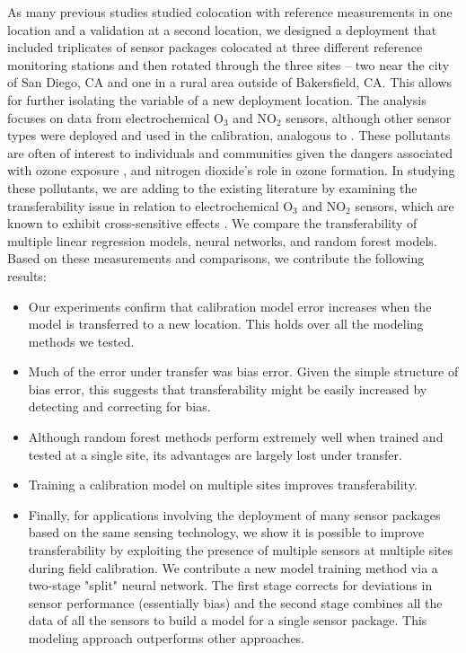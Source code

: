 \documentclass[journal abbreviation, manuscript]{copernicus}
\newcommand{\textus}[1]{$_{\text{#1}}$}
\begin{document}
As many previous studies studied colocation with reference measurements in one location and a validation at a second location, we designed a deployment that included triplicates of sensor packages colocated at three different reference monitoring stations and then rotated through the three sites – two  near the city of San Diego, CA and one in a rural area outside of Bakersfield, CA.   This allows for further isolating the variable of a new deployment location. The analysis focuses on data from electrochemical O\textus{3} and NO\textus{2} sensors, although other sensor types were deployed and used in the calibration, analogous to \citep{Bigi2018performance}.  These pollutants are often of interest to individuals and communities given the dangers associated with ozone exposure \citep{Brunekreef2002Air}, and nitrogen dioxide’s role in ozone formation. In studying these pollutants, we are adding to the existing literature by examining the transferability issue in relation to electrochemical O\textus{3} and NO\textus{2} sensors, which are known to exhibit cross-sensitive effects \citep{SPINELLE2015480}.  We compare the transferability of multiple linear regression models, neural networks, and random forest models.  Based on these measurements and comparisons, we contribute the following results:

\begin{itemize}
\item Our experiments confirm that calibration model error increases when the model is transferred to a new location.  This holds over all the modeling methods we tested.
\item Much of the error under transfer was bias error.  Given the simple structure of bias error, this suggests that transferability might be easily increased by detecting and correcting for bias.
\item Although random forest methods perform extremely well when trained and tested at a single site, its advantages are largely lost under transfer.
\item Training a calibration model on multiple sites improves transferability.
\item Finally, for applications involving the deployment of many sensor packages based on the same sensing technology, we show it is possible to improve transferability by exploiting the presence of multiple sensors at multiple sites during field calibration.  We contribute a new model training method via a two-stage "split" neural network.  The first stage corrects for deviations in sensor performance (essentially bias) and the second stage combines all the data of all the sensors to build a model for a single sensor package.  This modeling approach outperforms other approaches.
\end{itemize}
 
\end{document}
